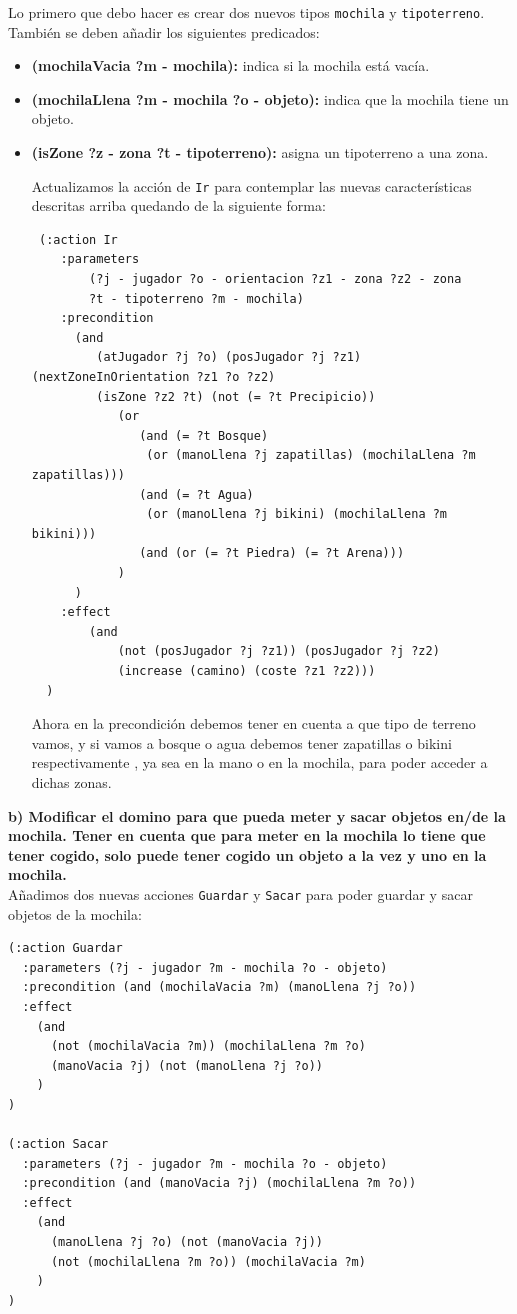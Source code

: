 \documentclass[12pt]{article}
\begin{document}
Lo primero que debo hacer es crear dos nuevos tipos \texttt{mochila} y \texttt{tipoterreno}. También se deben añadir los siguientes predicados:
\begin{itemize}
	\item \textbf{(mochilaVacia ?m - mochila):} indica si la mochila está vacía.
	\item \textbf{(mochilaLlena ?m - mochila ?o - objeto):} indica que la mochila tiene un objeto.
	\item \textbf{(isZone ?z - zona ?t - tipoterreno):} asigna un tipoterreno a una zona.
	
Actualizamos la acción de \texttt{Ir} para contemplar las nuevas características descritas arriba quedando de la siguiente forma:

\begin{verbatim}
 (:action Ir
    :parameters 
    	(?j - jugador ?o - orientacion ?z1 - zona ?z2 - zona 
    	?t - tipoterreno ?m - mochila)
    :precondition
      (and
         (atJugador ?j ?o) (posJugador ?j ?z1) (nextZoneInOrientation ?z1 ?o ?z2) 	
         (isZone ?z2 ?t) (not (= ?t Precipicio))
            (or
               (and (= ?t Bosque) 
               	(or (manoLlena ?j zapatillas) (mochilaLlena ?m zapatillas)))
               (and (= ?t Agua) 
               	(or (manoLlena ?j bikini) (mochilaLlena ?m bikini)))
               (and (or (= ?t Piedra) (= ?t Arena)))
            )
      )
    :effect 
    	(and 
    		(not (posJugador ?j ?z1)) (posJugador ?j ?z2) 
    		(increase (camino) (coste ?z1 ?z2)))
  )
\end{verbatim}

Ahora en la precondición debemos tener en cuenta a que tipo de terreno vamos, y si vamos a bosque o agua debemos tener zapatillas o bikini respectivamente , ya sea en la mano o en la mochila, para poder acceder a dichas zonas.
     
     
\end{itemize}

\textbf{b) Modificar el domino para que pueda meter y sacar objetos en/de la mochila. Tener en cuenta que para meter en la mochila lo tiene que tener cogido, solo puede tener cogido un objeto a la vez y uno en la mochila.}\\

Añadimos dos nuevas acciones \texttt{Guardar} y \texttt{Sacar} para poder guardar y sacar objetos de la mochila:

\begin{verbatim}
(:action Guardar
  :parameters (?j - jugador ?m - mochila ?o - objeto)
  :precondition (and (mochilaVacia ?m) (manoLlena ?j ?o))
  :effect 
    (and 
      (not (mochilaVacia ?m)) (mochilaLlena ?m ?o) 
      (manoVacia ?j) (not (manoLlena ?j ?o))
    )
)

(:action Sacar
  :parameters (?j - jugador ?m - mochila ?o - objeto)
  :precondition (and (manoVacia ?j) (mochilaLlena ?m ?o))
  :effect 
    (and 
      (manoLlena ?j ?o) (not (manoVacia ?j)) 
      (not (mochilaLlena ?m ?o)) (mochilaVacia ?m)
    )
)
\end{verbatim}
\end{document}
